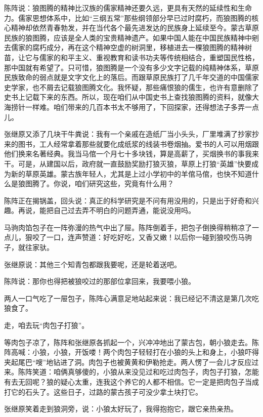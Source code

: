 \par 陈阵说：狼图腾的精神比汉族的儒家精神还要久远，更具有天然的延续性和生命力。儒家思想体系中，比如“三纲五常”那些纲领部分早已过时腐朽，而狼图腾的核心精神却依然青春勃发，并在当代各个最先进发达的民族身上延续至今。蒙古草原民族的狼图腾，应该是全人类的宝贵精神遗产。如果中国人能在中国民族精神中剜去儒家的腐朽成分，再在这个精神空虚的树洞里，移植进去一棵狼图腾的精神树苗，让它与儒家的和平主义、重视教育和读书功夫等传统相结合，重塑国民性格，那中国就有希望了。只可惜，狼图腾是一个没有多少文字记载的纯精神体系，草原民族致命的弱点就是文字文化上的落后。而跟草原民族打了几千年交道的中国儒家史学家，也不屑去记载狼图腾文化。我怀疑，那些痛恨狼的儒生，也许有意删除了史书上记载下来的东西。所以，现在咱们从中国史书上查找狼图腾的资料，就像大海捞针一样难。咱们带来的几百本书太不够用了，下回探家，还得想法子多弄一点儿。
\par 张继原又添了几块干牛粪说：我有一个亲戚在造纸厂当小头头，厂里堆满了抄家抄来的图书，工人经常拿着那些就要化成纸浆的线装书卷烟抽。爱书的人可以用烟跟他们换来名著经典。我当马倌一个月七十多块钱，算是高薪了，买烟换书的事我来干。可是，从建国以后，政府就一直鼓励奖励打狼灭狼，草原上打狼“英雄”快要成为新的草原英雄。蒙古族年轻人，尤其是上过小学初中的羊倌马倌，也快不知道什么是狼图腾了。你说，咱们研究这些，究竟有什么用？
\par 陈阵正在揭锅盖，回头说：真正的科学研究是不问有用没用的，只是出于好奇和兴趣。再说，能把自己过去弄不明白的问题弄通，能说没用吗。
\par 马驹肉馅包子在一阵弥漫的热气中出了屉。陈阵倒着手，把包子倒换得稍稍凉了一点儿，狠咬了一口，连声赞道：好吃好吃，又香又嫩！以后你一碰到狼咬伤马驹子，就往家驮。
\par 张继原说：其他三个知青包都跟我要呢，还是轮着送吧。
\par 陈阵说：那你也得把被狼咬过的那部位拿回来，我要喂小狼。
\par 两人一口气吃了一屉包子，陈阵心满意足地站起来说：我已经记不清这是第几次吃狼食了。
\par 走，咱去玩“肉包子打狼”。
\par 等肉包子凉了，陈阵和张继原各抓起一个，兴冲冲地出了蒙古包，朝小狼走去。陈阵高喊：小狼，小狼，开饭喽！两个肉包子轻轻打在小狼的头上和身上，小狼吓得夹起尾巴“嗖”地钻进了洞。肉包子也被黄黄和伊勒抢走。两人愣了一会儿才反应过来。陈阵笑道：咱俩真够傻的，小狼从来没见过和吃过肉包子，肉包子打狼，怎能有去无回呢？狼的疑心太重，连我这个养它的人都不相信。它一定是把肉包子当成打它的石头了。这些日子，过路的蒙古孩子可没少拿土块打它。
\par 张继原笑着走到狼洞旁，说：小狼太好玩了，我得抱抱它，跟它亲热亲热。
